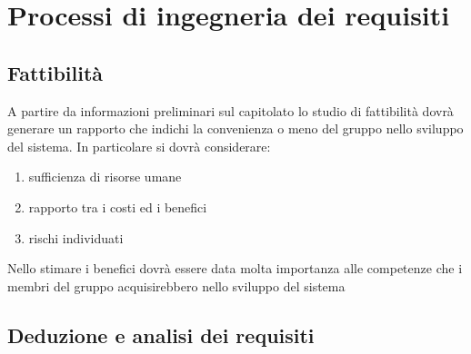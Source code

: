 \section{Processi di ingegneria dei requisiti}{
	\subsection{Fattibilità}{
		A partire da informazioni preliminari sul capitolato lo studio di fattibilità dovrà generare un rapporto che indichi la convenienza o meno del gruppo nello sviluppo del sistema. In particolare si dovrà considerare:
		\begin{enumerate}
			\item sufficienza di risorse umane
			\item rapporto tra i costi ed i benefici
			\item rischi individuati
		\end{enumerate}
		Nello stimare i benefici dovrà essere data molta importanza alle competenze che i membri del gruppo acquisirebbero nello sviluppo del sistema
	 }
	\subsection{Deduzione e analisi dei requisiti}{ 
}}
